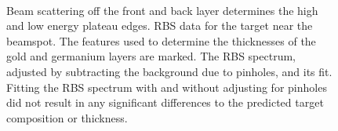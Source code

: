 \begin{figure}[!htbp]
\centering
{}
\\
\caption{ Beam scattering off the front and back layer determines the high and low energy plateau edges.   RBS data for the  target near the beamspot.  The features used to determine the thicknesses of the gold and germanium layers are marked.   The RBS spectrum, adjusted by subtracting the background due to pinholes, and its fit.  Fitting the RBS spectrum with and without adjusting for pinholes did not result in any significant differences to the predicted target composition or thickness.}
\end{figure}
